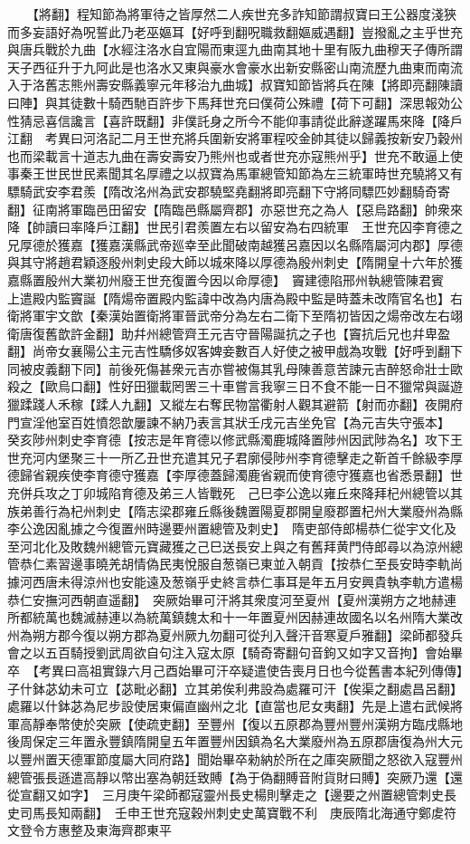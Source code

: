 　　【將翻】程知節為將軍待之皆厚然二人疾世充多詐知節謂叔寶曰王公器度淺狹而多妄語好為呪誓此乃老巫嫗耳【好呼到翻呪職救翻嫗威遇翻】豈撥亂之主乎世充與唐兵戰於九曲【水經注洛水自宜陽而東逕九曲南其地十里有阪九曲穆天子傳所謂天子西征升于九阿此是也洛水又東與豪水會豪水出新安縣密山南流歷九曲東而南流入于洛舊志熊州壽安縣義寧元年移治九曲城】叔寶知節皆將兵在陳【將即亮翻陳讀曰陣】與其徒數十騎西馳百許步下馬拜世充曰僕荷公殊禮【荷下可翻】深思報効公性猜忌喜信讒言【喜許既翻】非僕託身之所今不能仰事請從此辭遂躍馬來降【降戶江翻　考異曰河洛記二月王世充將兵圍新安將軍程咬金帥其徒以歸義按新安乃穀州也而梁載言十道志九曲在壽安壽安乃熊州也或者世充亦寇熊州乎】世充不敢逼上使事秦王世民世民素聞其名厚禮之以叔寶為馬軍總管知節為左三統軍時世充驍將又有驃騎武安李君羨【隋改洺州為武安郡驍堅堯翻將即亮翻下守將同驃匹妙翻騎奇寄翻】征南將軍臨邑田留安【隋臨邑縣屬齊郡】亦惡世充之為人【惡烏路翻】帥衆來降【帥讀曰率降戶江翻】世民引君羨置左右以留安為右四統軍　王世充囚李育德之兄厚德於獲嘉【獲嘉漢縣武帝廵幸至此聞破南越獲呂嘉因以名縣隋屬河内郡】厚德與其守將趙君穎逐殷州刺史段大師以城來降以厚德為殷州刺史【隋開皇十六年於獲嘉縣置殷州大業初州廢王世充復置今因以命厚德】　竇建德陷邢州執總管陳君賓　上遣殿内監竇誕【隋煬帝置殿内監諱中改為内唐為殿中監是時蓋未改隋官名也】右衛將軍宇文歆【秦漢始置衛將軍晉武帝分為左右二衛下至隋初皆因之煬帝改左右翊衛唐復舊歆許金翻】助幷州總管齊王元吉守晉陽誕抗之子也【竇抗后兄也幷卑盈翻】尚帝女襄陽公主元吉性驕侈奴客婢妾數百人好使之被甲戲為攻戰【好呼到翻下同被皮義翻下同】前後死傷甚衆元吉亦嘗被傷其乳母陳善意苦諫元吉醉怒命壯士歐殺之【歐烏口翻】性好田獵載罔罟三十車嘗言我寧三日不食不能一日不獵常與誕遊獵蹂踐人禾稼【蹂人九翻】又縱左右奪民物當衢射人觀其避箭【射而亦翻】夜開府門宣淫他室百姓憤怨歆屢諫不納乃表言其狀壬戌元吉坐免官【為元吉失守張本】　癸亥陟州刺史李育德【按志是年育德以修武縣濁鹿城降置陟州因武陟為名】攻下王世充河内堡聚三十一所乙丑世充遣其兄子君廓侵陟州李育德擊走之靳首千餘級李厚德歸省親疾使李育德守獲嘉【李厚德蓋歸濁鹿省親而使育德守獲嘉也省悉景翻】世充併兵攻之丁卯城陷育德及弟三人皆戰死　己巳李公逸以雍丘來降拜杞州總管以其族弟善行為杞州刺史【隋志梁郡雍丘縣後魏置陽夏郡開皇廢郡置杞州大業廢州為縣李公逸因亂據之今復置州時邊要州置總管及刺史】　隋吏部侍郎楊恭仁從宇文化及至河北化及敗魏州總管元寶藏獲之己巳送長安上與之有舊拜黄門侍郎尋以為涼州總管恭仁素習邊事曉羌胡情偽民夷悅服自葱嶺已東並入朝貢【按恭仁至長安時李軌尚據河西唐未得涼州也安能遠及葱嶺乎史終言恭仁事耳是年五月安興貴執李軌方遣楊恭仁安撫河西朝直遥翻】　突厥始畢可汗將其衆度河至夏州【夏州漢朔方之地赫連所都統萬也魏滅赫連以為統萬鎮魏太和十一年置夏州因赫連故國名以名州隋大業改州為朔方郡今復以朔方郡為夏州厥九勿翻可從刋入聲汗音寒夏戶雅翻】梁師都發兵會之以五百騎授劉武周欲自句注入寇太原【騎奇寄翻句音鉤又如字又音拘】會始畢卒　【考異曰高祖實錄六月己酉始畢可汗卒疑遣使告喪月日也今從舊書本紀列傳傳】子什鉢苾幼未可立【苾毗必翻】立其弟俟利弗設為處羅可汗【俟渠之翻處昌呂翻】處羅以什鉢苾為尼步設使居東偏直幽州之北【直當也尼女夷翻】先是上遣右武候將軍高靜奉幣使於突厥【使疏吏翻】至豐州【復以五原郡為豐州豐州漢朔方臨戌縣地後周保定三年置永豐鎮隋開皇五年置豐州因鎮為名大業廢州為五原郡唐復為州大元以豐州置天德軍節度屬大同府路】聞始畢卒勑納於所在之庫突厥聞之怒欲入寇豐州總管張長遜遣高靜以幣出塞為朝廷致賻【為于偽翻賻音附貨財曰賻】突厥乃還【還從宣翻又如字】　三月庚午梁師都寇靈州長史楊則擊走之【邊要之州置總管刺史長史司馬長知兩翻】　壬申王世充寇穀州刺史史萬寶戰不利　庚辰隋北海通守鄭䖍符文登令方惠整及東海齊郡東平